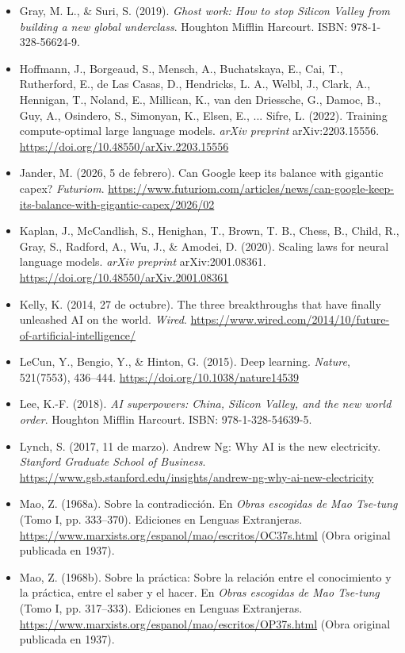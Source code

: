 \begin{itemize}[leftmargin=1.5em, label={}, itemsep=0.22ex, parsep=0pt]
    \item Gray, M. L., \& Suri, S. (2019). \textit{Ghost work: How to stop Silicon Valley from building a new global underclass}. Houghton Mifflin Harcourt. ISBN: 978-1-328-56624-9.
    \item Hoffmann, J., Borgeaud, S., Mensch, A., Buchatskaya, E., Cai, T., Rutherford, E., de Las Casas, D., Hendricks, L. A., Welbl, J., Clark, A., Hennigan, T., Noland, E., Millican, K., van den Driessche, G., Damoc, B., Guy, A., Osindero, S., Simonyan, K., Elsen, E., ... Sifre, L. (2022). Training compute-optimal large language models. \textit{arXiv preprint} arXiv:2203.15556. \url{https://doi.org/10.48550/arXiv.2203.15556}
    \item Jander, M. (2026, 5 de febrero). Can Google keep its balance with gigantic capex? \textit{Futuriom}. \url{https://www.futuriom.com/articles/news/can-google-keep-its-balance-with-gigantic-capex/2026/02}
    \item Kaplan, J., McCandlish, S., Henighan, T., Brown, T. B., Chess, B., Child, R., Gray, S., Radford, A., Wu, J., \& Amodei, D. (2020). Scaling laws for neural language models. \textit{arXiv preprint} arXiv:2001.08361. \url{https://doi.org/10.48550/arXiv.2001.08361}
    \item Kelly, K. (2014, 27 de octubre). The three breakthroughs that have finally unleashed AI on the world. \textit{Wired}. \url{https://www.wired.com/2014/10/future-of-artificial-intelligence/}
    \item LeCun, Y., Bengio, Y., \& Hinton, G. (2015). Deep learning. \textit{Nature}, 521(7553), 436--444. \url{https://doi.org/10.1038/nature14539}
    \item Lee, K.-F. (2018). \textit{AI superpowers: China, Silicon Valley, and the new world order}. Houghton Mifflin Harcourt. ISBN: 978-1-328-54639-5.
    \item Lynch, S. (2017, 11 de marzo). Andrew Ng: Why AI is the new electricity. \textit{Stanford Graduate School of Business}. \url{https://www.gsb.stanford.edu/insights/andrew-ng-why-ai-new-electricity}
    \item Mao, Z. (1968a). Sobre la contradicción. En \textit{Obras escogidas de Mao Tse-tung} (Tomo I, pp. 333--370). Ediciones en Lenguas Extranjeras. \url{https://www.marxists.org/espanol/mao/escritos/OC37s.html} (Obra original publicada en 1937).
    \item Mao, Z. (1968b). Sobre la práctica: Sobre la relación entre el conocimiento y la práctica, entre el saber y el hacer. En \textit{Obras escogidas de Mao Tse-tung} (Tomo I, pp. 317--333). Ediciones en Lenguas Extranjeras. \url{https://www.marxists.org/espanol/mao/escritos/OP37s.html} (Obra original publicada en 1937).

\end{itemize}
